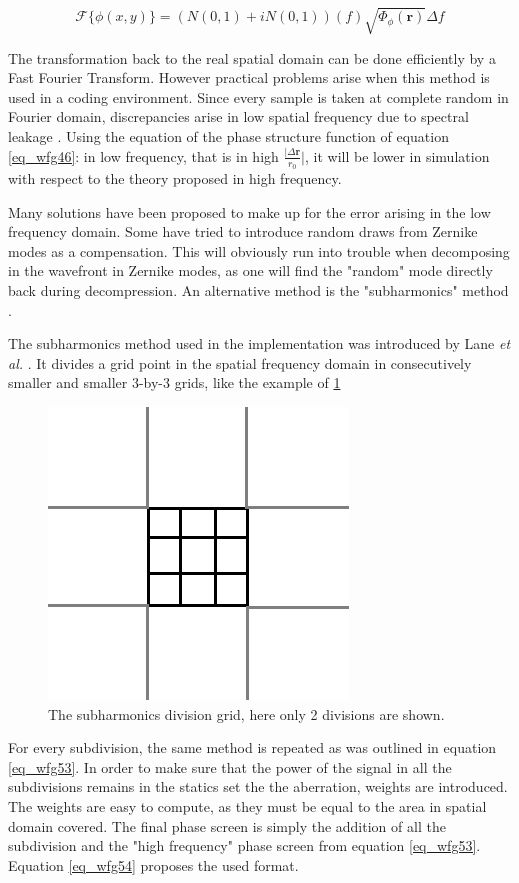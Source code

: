\documentclass{article}
\begin{document}
\begin{equation}
\mathcal{F}\{ \phi(x,y)\} =  \left( N(0,1) + i N(0,1) \right)(f) \sqrt{\Phi_{\phi}(\textbf{r})} \Delta f 
\label{eq_wfg53}
\end{equation}

The transformation back to the real spatial domain can be done efficiently by a Fast Fourier Transform. However practical problems arise when this method is used in a coding environment. Since every sample is taken at complete random in Fourier domain, discrepancies arise in low spatial frequency due to spectral leakage \cite{lane1992simulation}. Using the equation of the phase structure function of equation \ref{eq_wfg46}: in low frequency, that is in high $\frac{| \Delta \textbf{r}}{r_0}|$, it will be lower in simulation with respect to the theory proposed in high frequency.

Many solutions have been proposed to make up for the error arising in the low frequency domain. Some have tried to introduce random draws from Zernike modes as a compensation. This will obviously run into trouble when decomposing in the wavefront in Zernike modes, as one will find the "random" mode directly back during decompression. An alternative method is the "subharmonics" method \cite{zernikeCircle}. %

\newpage
The subharmonics method used in the implementation was introduced by Lane \textit{et al.}  \cite{lane1992simulation}. It divides a grid point in the spatial frequency domain in consecutively smaller and smaller 3-by-3 grids, like the example of \ref{fig_wfg04}

\begin{figure}[H]
	\center
	\includegraphics[height=1.0\textwidth, height=.3\textwidth]{Figures/subharmonics.png}
	\caption{The subharmonics division grid, here only 2 divisions are shown.}
	\label{fig_wfg04}
\end{figure}

For every subdivision, the same method is repeated as was outlined in equation \ref{eq_wfg53}. In order to make sure that the power of the signal in all the subdivisions remains in the statics set the the aberration, weights are introduced. The weights are easy to compute, as they must be equal to the area in spatial domain covered. The final phase screen is simply the addition of all the subdivision and the "high frequency" phase screen from equation \ref{eq_wfg53}. Equation \ref{eq_wfg54} proposes the used format.
\end{document}
